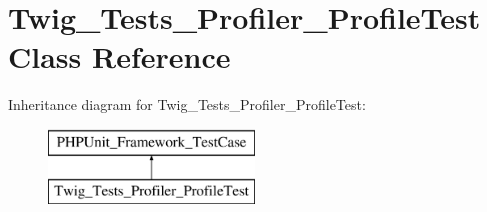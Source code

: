 \hypertarget{classTwig__Tests__Profiler__ProfileTest}{}\section{Twig\+\_\+\+Tests\+\_\+\+Profiler\+\_\+\+Profile\+Test Class Reference}
\label{classTwig__Tests__Profiler__ProfileTest}
Inheritance diagram for Twig\+\_\+\+Tests\+\_\+\+Profiler\+\_\+\+Profile\+Test\+:\begin{figure}[H]
\begin{center}
\leavevmode
\includegraphics[height=2.000000cm]{classTwig__Tests__Profiler__ProfileTest}
\end{center}
\end{figure}
